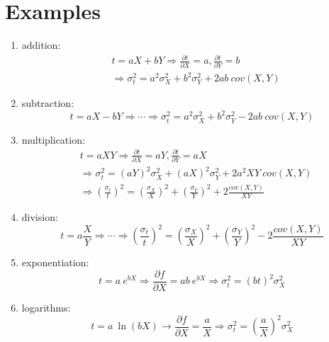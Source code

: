 \documentclass{book}
\begin{document}
\section{Examples}

\begin{enumerate}
\item{addition:}
\begin{align}
& t = a X + b Y \Rightarrow \frac{\partial t}{\partial X} = a, 
\frac{\partial t}{\partial Y} = b\\
& \Rightarrow \sigma^2_t = a^2 \sigma^2_X + b^2 \sigma^2_Y + 2ab~cov(X,Y)
\label{eq:addition}
\end{align}

\item{subtraction:}
\begin{equation}
t = a X - b Y \Rightarrow \cdots \Rightarrow 
\sigma^2_t = a^2 \sigma^2_X + b^2 \sigma^2_Y - 2ab~cov(X,Y)
\label{eq:subtraction}
\end{equation}

\item{multiplication:}
\begin{align}
& t = a X Y \Rightarrow \frac{\partial t}{\partial X} = a Y, 
\frac{\partial t}{\partial Y} = aX\\
& \Rightarrow \sigma^2_t = (aY)^2 \sigma^2_X + (aX)^2 \sigma^2_Y + 2a^2 XY~cov(X,Y)\\
& \Rightarrow \left(\frac{\sigma_t}{t}\right)^2 = \left(\frac{\sigma_X}{X}\right)^2 + 
  \left(\frac{\sigma_Y}{Y}\right)^2 + 2 \frac{cov(X,Y)}{X Y}
\label{eq:multiplication}
\end{align}

\item{division:}
\begin{equation}
t = a \frac{X}{Y} \Rightarrow \cdots \Rightarrow 
\left(\frac{\sigma_t}{t}\right)^2 = \left(\frac{\sigma_X}{X}\right)^2 + 
  \left(\frac{\sigma_Y}{Y}\right)^2 - 2 \frac{cov(X,Y)}{X Y}
\label{eq:division}
\end{equation}

\item{exponentiation:}
\begin{equation}
t = a~e^{bX} \Rightarrow \frac{\partial f}{\partial X} = ab~e^{bX} 
\Rightarrow \sigma^2_t = (b t)^2 \sigma_X^2
\label{eq:exponentiation}
\end{equation}

\item{logarithms:}
\begin{equation}
t = a~\ln(bX) \rightarrow \frac{\partial f}{\partial X} = \frac{a}{X}
\Rightarrow \sigma_t^2 = \left(\frac{a}{X}\right)^2 \sigma_X^2
\label{eq:logarithms}
\end{equation}

\end{enumerate}
\end{document}
